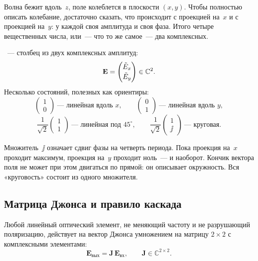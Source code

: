 \begin{intuition}
Волна бежит вдоль~$z$, поле колеблется в плоскости $(x,y)$. Чтобы полностью описать колебание,
достаточно сказать, что происходит с проекцией на~$x$ и с проекцией на~$y$: у каждой своя
амплитуда и своя фаза. Итого четыре вещественных числа, или~--- что то же самое~--- два
комплексных.
\end{intuition}

\noindent
{}~--- столбец из двух комплексных амплитуд:
\[
  \mathbf{E}=\begin{pmatrix}\tilde{E}_x\\[2pt] \tilde{E}_y\end{pmatrix}\in\mathbb{C}^2 .
\]
Несколько состояний, полезных как ориентиры:
\[
  \begin{pmatrix}1\\0\end{pmatrix}\ \text{--- линейная вдоль }x,
  \qquad
  \begin{pmatrix}0\\1\end{pmatrix}\ \text{--- линейная вдоль }y,
\]
\[
  \frac{1}{\sqrt2}\begin{pmatrix}1\\1\end{pmatrix}\ \text{--- линейная под }45^\circ,
  \qquad
  \frac{1}{\sqrt2}\begin{pmatrix}1\\ \jj\end{pmatrix}\ \text{--- круговая.}
\]

\begin{intuition}
Множитель~$\jj$ означает сдвиг фазы на четверть периода. Пока проекция на~$x$ проходит максимум,
проекция на~$y$ проходит ноль~--- и наоборот. Кончик вектора поля не может при этом двигаться по
прямой: он описывает окружность. Вся «круговость» состоит из одного множителя.
\end{intuition}

\subsection{Матрица Джонса и правило каскада}

\begin{strict}
Любой линейный оптический элемент, не меняющий частоту и не разрушающий поляризацию, действует на
вектор Джонса умножением на матрицу $2\times2$ с комплексными элементами:
\[
  \mathbf{E}_{\text{вых}}=\mathbf{J}\,\mathbf{E}_{\text{вх}},
  \qquad \mathbf{J}\in\mathbb{C}^{2\times2}.
\]
\end{strict}

